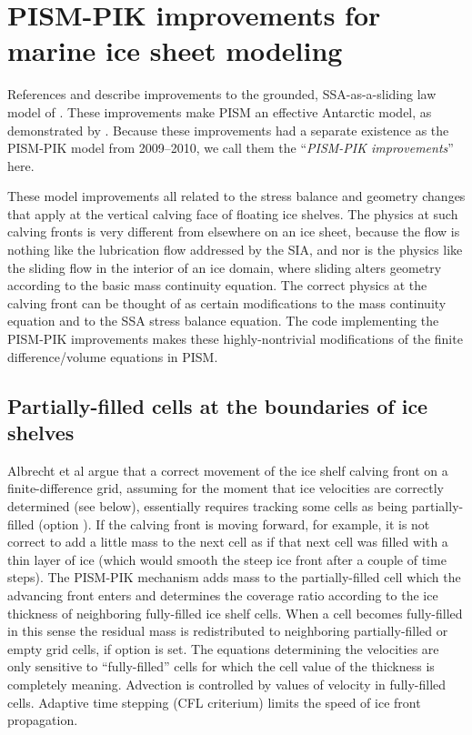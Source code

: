 

\section{PISM-PIK improvements for marine ice sheet modeling}
\label{sec:pism-pik}

References \cite{Albrechtetal2011} and \cite{Winkelmannetal2010TCD} describe improvements to the grounded, SSA-as-a-sliding law model of \cite{BBssasliding}.  These improvements make PISM an effective Antarctic model, as demonstrated by \cite{Martinetal2010TCD,Levermann2011}.  Because these improvements had a separate existence as the PISM-PIK model from 2009--2010, we call them the ``\emph{PISM-PIK improvements}'' here.

These model improvements all related to the stress balance and geometry changes that apply at the vertical calving face of floating ice shelves.  The physics at such calving fronts is very different from elsewhere on an ice sheet, because the flow is nothing like the lubrication flow addressed by the SIA, and nor is the physics like the sliding flow in the interior of an ice domain, where sliding alters geometry according to the basic mass continuity equation.  The correct physics at the calving front can be thought of as certain modifications to the mass continuity equation and to the SSA stress balance equation.  The code implementing the PISM-PIK improvements makes these highly-nontrivial modifications of the finite difference/volume equations in PISM.

\subsection{Partially-filled cells at the boundaries of ice shelves}
\label{sec:part-grid}

Albrecht et al \cite{Albrechtetal2011} argue that a correct movement of the ice shelf calving front on a finite-difference grid, assuming for the moment that ice velocities are correctly determined (see below), essentially requires tracking some cells as being partially-filled (option ). If the calving front is moving forward, for example, it is not correct to add a little mass to the next cell as if that next cell was filled with a thin layer of ice (which would smooth the steep ice front after a couple of time steps).  The PISM-PIK mechanism adds mass to the partially-filled cell which the advancing front enters and determines the coverage ratio according to the ice thickness of neighboring fully-filled ice shelf cells. When a cell becomes fully-filled in this sense the residual mass is redistributed to neighboring partially-filled or empty grid cells, if option  is set. The equations determining the velocities are only sensitive to ``fully-filled'' cells for which the cell value of the thickness is completely meaning. Advection is controlled by values of velocity in fully-filled cells. Adaptive time stepping (CFL criterium) limits the speed of ice front propagation.

